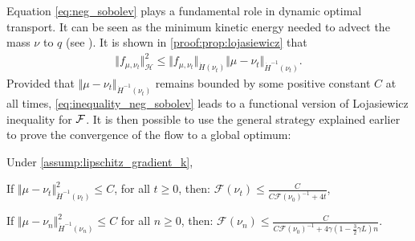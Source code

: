 Equation \cref{eq:neg_sobolev} plays a fundamental role in dynamic optimal transport. %
It can be seen as the minimum kinetic energy needed to advect the mass $\nu$ to $q$ (see \cite{Mroueh:2019}). It is shown in \cref{proof:prop:lojasiewicz} that
\begin{align}\label{eq:inequality_neg_sobolev}
	\Vert f_{\mu,\nu_t} \Vert^2_{\mathcal{H}} \leq \Vert f_{\mu,\nu_t} \Vert_{\dot{H}(\nu_t)} \Vert  \mu -\nu_t\Vert_{\dot{H}^{-1}(\nu_t)}  .
\end{align}
Provided that $\Vert \mu - \nu_t \Vert_{\dot{H}^{-1}(\nu_t)} $ remains bounded by some positive constant $C$ at all times, \cref{eq:inequality_neg_sobolev} leads to  a functional version of Lojasiewicz inequality for ${{\mathcal F}}$. 
It is then possible to use the general strategy explained earlier to prove the convergence of the flow to a global optimum:
\begin{proposition}\label{prop:lojasiewicz}
		Under \cref{assump:lipschitz_gradient_k},
		\begin{proplist}
			\item If $\Vert \mu - \nu_t \Vert^2_{\dot{H}^{-1}(\nu_t)} \leq C$, for all $t\geq 0$, then: $\mathcal{F}(\nu_t)\leq \frac{C}{C\mathcal{F}(\nu_0)^{-1} + 4t}$,
			\item If $\Vert \mu - \nu_n \Vert^2_{\dot{H}^{-1}(\nu_n)} \leq C$ for all $n\geq 0$, then: $\mathcal{F}(\nu_n)\leq \frac{C}{C\mathcal{F}(\nu_0)^{-1} + 4\gamma(1-\frac{3}{2}\gamma L) n}$.
		\end{proplist}
\end{proposition}
